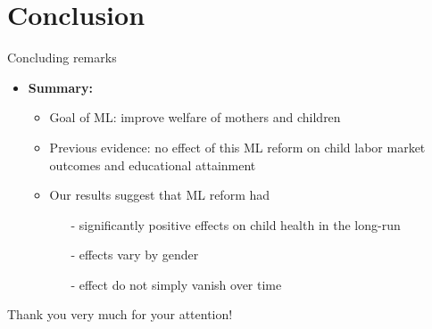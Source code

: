\documentclass[usenames,dvipsnames]{beamer} %
\begin{document}
\section{Conclusion}
\begin{frame}{Concluding remarks}
\begin{itemize}
\item \textbf{Summary:}
\begin{itemize}
\item Goal of ML: improve welfare of mothers and children
\item Previous evidence: no effect of this ML reform on child labor market outcomes and educational attainment

\item Our results suggest that ML reform had
\begin{itemize}
\item[-] significantly positive effects on child health in the long-run
\item[-] effects vary by gender
\item[-] effect do not simply vanish over time
\end{itemize}




\end{itemize}
\end{itemize}



\end{frame}




\begin{frame}
\begin{center}
Thank you very much for your attention!
\end{center}




\end{frame}
\end{document}
